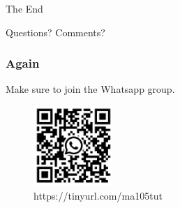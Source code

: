 \documentclass[
	11pt, %
]{beamer}
\begin{document}

\begin{frame}[plain] %
	\begin{center}
		{\Huge The End}
		
		\bigskip\bigskip %
		
		{\LARGE Questions? Comments?}
	\end{center}
\end{frame}

\begin{frame}
	\frametitle{Again}
	Make sure to join the Whatsapp group.
	\begin{figure}
		\centering
		\includegraphics[width=3cm]{./qr.jpeg}
		\caption{https://tinyurl.com/ma105tut}
	\end{figure}
	
\end{frame}

\end{document}
